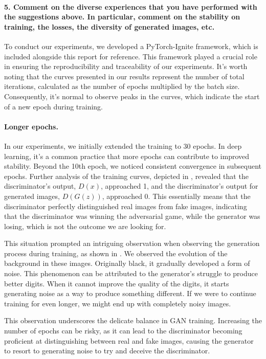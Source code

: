 \newpage
\paragraph*{5. Comment on the diverse experiences that you have performed with the suggestions above. In particular, comment on the stability on training, the losses, the diversity of generated images, etc.}

To conduct our experiments, we developed a PyTorch-Ignite framework, which is included alongside this report for reference. This framework played a crucial role in ensuring the reproducibility and traceability of our experiments. It's worth noting that the curves presented in our results represent the number of total iterations, calculated as the number of epochs multiplied by the batch size. Consequently, it's normal to observe peaks in the curves, which indicate the start of a new epoch during training.

\paragraph*{Longer epochs.}
In our experiments, we initially extended the training to 30 epochs. In deep learning, it's a common practice that more epochs can contribute to improved stability. Beyond the 10th epoch, we noticed consistent convergence in subsequent epochs. Further analysis of the training curves, depicted in , revealed that the discriminator's output, $D(x)$, approached 1, and the discriminator's output for generated images, $D(G(z))$, approached 0. This essentially means that the discriminator perfectly distinguished real images from fake images, indicating that the discriminator was winning the adversarial game, while the generator was losing, which is not the outcome we are looking for. 

This situation prompted an intriguing observation when observing the generation process during training, as shown in . We observed the evolution of the background in these images. Originally black, it gradually developed a form of noise. This phenomenon can be attributed to the generator's struggle to produce better digits. When it cannot improve the quality of the digits, it starts generating noise as a way to produce something different. If we were to continue training for even longer, we might end up with completely noisy images. 

This observation underscores the delicate balance in GAN training. Increasing the number of epochs can be risky, as it can lead to the discriminator becoming proficient at distinguishing between real and fake images, causing the generator to resort to generating noise to try and deceive the discriminator.

